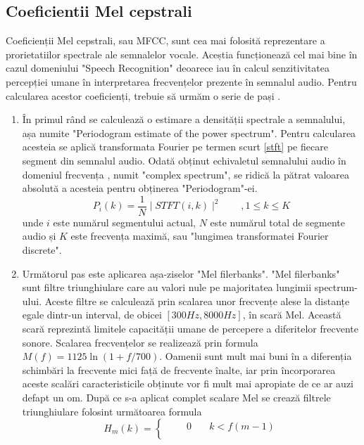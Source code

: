 \documentclass[a4paper,12pt]{book}
\begin{document}
			\subsection{Coeficientii Mel cepstrali}
				Coeficienții Mel cepstrali, sau MFCC, sunt cea mai folosită reprezentare a prorietatiilor spectrale ale semnalelor vocale. Aceștia funcționează cel mai bine în cazul domeniului "Speech Recognition" deoarece iau în calcul senzitivitatea percepției umane în interpretarea frecvențelor prezente în semnalul audio. Pentru calcularea acestor coeficienți, trebuie să urmăm o serie de pași \cite{mcs}.
					\begin{enumerate}
						\item 
							În primul rând se calculează o estimare a densității spectrale a semnalului, așa numite "Periodogram estimate of the power spectrum". Pentru calcularea acesteia se aplică transformata Fourier pe termen scurt \ref{stft} pe fiecare segment din semnalul audio. Odată obținut echivaletul semnalului audio în domeniul frecvența , numit "complex spectrum", se ridică la pătrat valoarea absolută a acesteia pentru obținerea "Periodogram"-ei.
							\begin{equation*}
								P_i(k) =\frac{1}{N}\mid STFT(i, k)\mid^2 \quad\quad,1\leq k\leq K
							\end{equation*}
							unde $i$ este numărul segmentului actual, $N$ este numărul total de segmente audio și $K$ este frecvența maximă, sau "lungimea transformatei Fourier discrete".
							\item Următorul pas este aplicarea așa-ziselor "Mel filerbanks". "Mel filerbanks" sunt filtre triunghiulare care au valori nule pe majoritatea lungimii spectrum-ului. Aceste filtre se calculează prin scalarea unor frecvențe alese la distanțe egale dintr-un interval, de obicei $[300Hz, 8000Hz]$, în scară Mel. Această scară reprezintă limitele capacității umane de percepere a diferitelor frecvente sonore. Scalarea frecvențelor se realizează prin formula $M(f) = 1125 \ln(1+ f/700)$. Oamenii sunt mult mai buni în a diferenția schimbări la frecvente mici față de frecvente înalte, iar prin încorporarea aceste scalări caracteristicile obținute vor fi mult mai apropiate de ce ar auzi defapt un om. \newline
							După ce s-a aplicat complet scalare Mel se crează filtrele triunghiulare folosint următoarea formula
						\begin{equation*}
							H_m(k) = 
							\begin{cases}
							\quad \quad 0&\quad k<f(m-1) \\[3pt]

\end{cases}
\end{equation*}
\end{enumerate}
\end{document}
